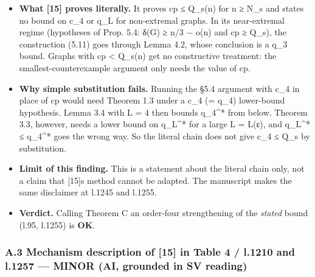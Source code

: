 \documentclass[
]{article}
\providecommand{\tightlist}{%
  \setlength{\itemsep}{0pt}\setlength{\parskip}{0pt}}
\begin{document}
\begin{itemize}
\tightlist
\item
  \textbf{What {[}15{]} proves literally.} It proves cp ≤ Q\_s(n) for n
  ≥ N\_s and states no bound on c\_4 or q\_L for non-extremal graphs. In
  its near-extremal regime (hypotheses of Prop. 5.4: δ(G) ≥ n/3 − o(n)
  and cp ≥ Q\_s), the construction (5.11) goes through Lemma 4.2, whose
  conclusion is a q\_3 bound. Graphs with cp \textless{} Q\_s(n) get no
  constructive treatment: the smallest-counterexample argument only
  needs the value of cp.
\item
  \textbf{Why simple substitution fails.} Running the §5.4 argument with
  c\_4 in place of cp would need Theorem 1.3 under a c\_4 (= q\_4)
  lower-bound hypothesis. Lemma 3.4 with L = 4 then bounds q\_4\^{}*
  from below. Theorem 3.3, however, needs a lower bound on q\_L\^{}* for
  a large L = L(ε), and q\_L\^{}* ≤ q\_4\^{}* goes the wrong way. So the
  literal chain does not give c\_4 ≤ Q\_s by substitution.
\item
  \textbf{Limit of this finding.} This is a statement about the literal
  chain only, not a claim that {[}15{]}\textquotesingle s method cannot
  be adapted. The manuscript makes the same disclaimer at l.1245 and
  l.1255.
\item
  \textbf{Verdict.} Calling Theorem C an order-four strengthening of the
  \emph{stated} bound (l.95, l.1255) is \textbf{OK}.
\end{itemize}

\subsubsection{\texorpdfstring{A.3 Mechanism description of {[}15{]} in
Table 4 / l.1210 and l.1257 --- \textbf{MINOR} (AI, grounded in SV
reading)}{A.3 Mechanism description of {[}15{]} in Table 4 / l.1210 and l.1257 --- MINOR (AI, grounded in SV reading)}}\label{a3-mechanism-description-of-15-in-table-4--l1210-and-l1257--minor-ai-grounded-in-sv-reading}
\end{document}
